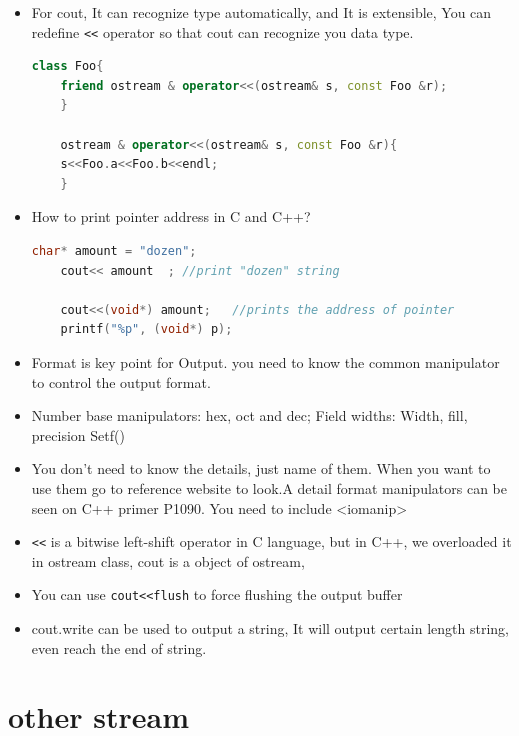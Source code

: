 \documentclass[a4paper,11pt,twoside]{book}
\begin{document}
\begin{itemize}
	\item For cout, It can recognize type automatically, and It is extensible, You can redefine \verb=<<= operator so that cout can recognize you data type.
	\begin{lstlisting}[frame=single, language=c++]
	class Foo{
	friend ostream & operator<<(ostream& s, const Foo &r);
	}
	
	ostream & operator<<(ostream& s, const Foo &r){
	s<<Foo.a<<Foo.b<<endl;
	}
	\end{lstlisting}
	
	\item  How to print pointer address in C and C++?
	\begin{lstlisting}[frame=single, language=c++]
	char* amount = "dozen";
	cout<< amount  ; //print "dozen" string
	
	cout<<(void*) amount;   //prints the address of pointer
	printf("%p", (void*) p);
	\end{lstlisting}
	
	
	\item Format is key point for Output. you need to know the common manipulator to control the output format.
	\item Number base manipulators:  hex, oct  and dec; Field widths: Width,  fill, precision Setf()
	\item You don't need to know the details, just name of them. When you want to use them go to reference website to look.A detail format manipulators can be seen on C++ primer P1090. You need to include <iomanip>
	
	\item \verb=<<= is a bitwise left-shift operator in C language, but in C++, we overloaded it in ostream class, cout is a object of ostream,
	
	\item You can use \verb=cout<<flush= to force flushing the output buffer
	\item cout.write can be used to output a string, It will output certain length string, even reach the end of string.
	
	
\end{itemize}

\section{other stream}
\end{document}
